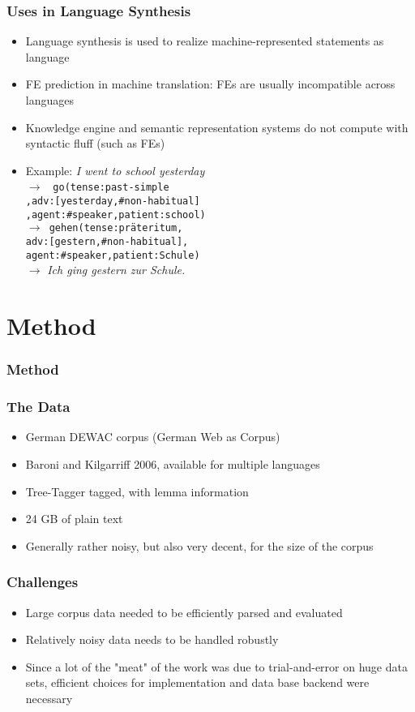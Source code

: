 \documentclass{beamer}
\begin{document}
\begin{frame}
\frametitle{Uses in Language Synthesis}

\begin{itemize}
\item Language synthesis is used to realize machine-represented statements as
language
\item FE prediction in machine translation: FEs are usually incompatible across
languages
\item Knowledge engine and semantic representation systems do not compute with
syntactic fluff (such as FEs)
\item Example: {\it I went \alert{to} school \alert{yesterday}}\\
$\to$ {\tt
go(tense:past-simple\\
  ,adv:[yesterday,\#non-habitual]\\
  ,agent:\#speaker,patient:school) }
\\$\to${\tt
gehen(tense:präteritum,\\adv:[gestern,\#non-habitual],\\agent:\#speaker,patient:Schule) }
\\$\to$ {\it  Ich ging \alert{gestern} \alert{zur} Schule.}
\end{itemize}
\end{frame}

\section{Method}
\begin{frame}
\frametitle{Method}

\end{frame}

\begin{frame}
\frametitle{The Data}

\begin{itemize}
\item German DEWAC corpus (German Web as Corpus)
\item Baroni and Kilgarriff 2006, available for multiple languages
\item Tree-Tagger tagged, with lemma information
\item 24 GB of plain text
\item Generally rather noisy, but also very decent, for the size of the corpus
\end{itemize}
\end{frame}

\begin{frame}
\frametitle{Challenges}

\begin{itemize}
\item Large corpus data needed to be efficiently parsed and evaluated
\item Relatively noisy data needs to be handled robustly
\item Since a lot of the "meat" of the work was due to trial-and-error on huge data
sets, efficient
choices for implementation and data base backend were necessary
\end{itemize}
\end{frame}
\end{document}
